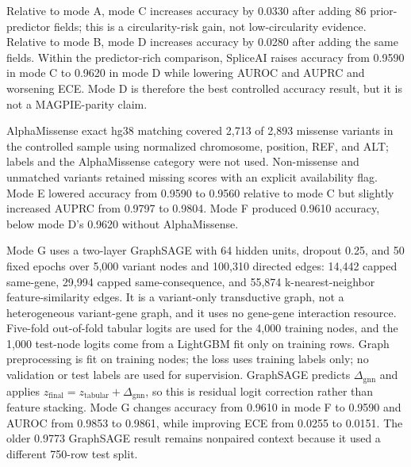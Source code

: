 \documentclass[conference]{IEEEtran}
\begin{document}
Relative to mode A, mode C increases accuracy by 0.0330 after adding 86 prior-predictor fields; this is a circularity-risk gain, not low-circularity evidence. Relative to mode B, mode D increases accuracy by 0.0280 after adding the same fields. Within the predictor-rich comparison, SpliceAI raises accuracy from 0.9590 in mode C to 0.9620 in mode D while lowering AUROC and AUPRC and worsening ECE. Mode D is therefore the best controlled accuracy result, but it is not a MAGPIE-parity claim.

AlphaMissense exact hg38 matching covered 2,713 of 2,893 missense variants in the controlled sample using normalized chromosome, position, REF, and ALT; labels and the AlphaMissense category were not used. Non-missense and unmatched variants retained missing scores with an explicit availability flag. Mode E lowered accuracy from 0.9590 to 0.9560 relative to mode C but slightly increased AUPRC from 0.9797 to 0.9804. Mode F produced 0.9610 accuracy, below mode D's 0.9620 without AlphaMissense.

Mode G uses a two-layer GraphSAGE with 64 hidden units, dropout 0.25, and 50 fixed epochs over 5,000 variant nodes and 100,310 directed edges: 14,442 capped same-gene, 29,994 capped same-consequence, and 55,874 k-nearest-neighbor feature-similarity edges. It is a variant-only transductive graph, not a heterogeneous variant-gene graph, and it uses no gene-gene interaction resource. Five-fold out-of-fold tabular logits are used for the 4,000 training nodes, and the 1,000 test-node logits come from a LightGBM fit only on training rows. Graph preprocessing is fit on training nodes; the loss uses training labels only; no validation or test labels are used for supervision. GraphSAGE predicts $\Delta_{\mathrm{gnn}}$ and applies $z_{\mathrm{final}}=z_{\mathrm{tabular}}+\Delta_{\mathrm{gnn}}$, so this is residual logit correction rather than feature stacking. Mode G changes accuracy from 0.9610 in mode F to 0.9590 and AUROC from 0.9853 to 0.9861, while improving ECE from 0.0255 to 0.0151. The older 0.9773 GraphSAGE result remains nonpaired context because it used a different 750-row test split.
\end{document}
